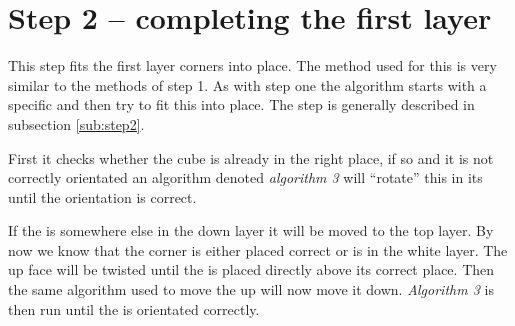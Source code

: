 \section{Step 2 -- completing the first layer}
This step fits the first layer corners into place. The method used for this is very similar to the methods of step 1. 
As with step one the algorithm starts with a specific \cpiece{} and then try to fit this into place. 
The step is generally described in subsection \ref{sub:step2}.

First it checks whether the cube is already in the right place, if so and it is not correctly orientated an algorithm denoted \textit{algorithm 3} will ``rotate'' this \cpiece{} in its \cubicle{} until the orientation is correct. 

If the \cpiece{} is somewhere else in the down layer it will be moved to the top layer. 
By now we know that the corner \cpiece{} is either placed correct or is in the white layer. 
The up face will be twisted until the \cpiece{} is placed directly above its correct place. 
Then the same algorithm used to move the \cpiece{} up will now move it down. 
\textit{Algorithm 3} is then run until the \cpiece{} is orientated correctly.
